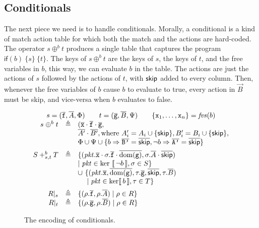 \subsection{Conditionals}

The next piece we need is to handle conditionals. Morally, a
conditional is a kind of match action table for which both the match
and the actions are hard-coded.  The operator $s \oplus^b t$ produces
a single table that captures the program
$\mathsf{if}(b)~\{s\}~\{t\}$. The keys of $s \oplus^b t$ are the keys
of $s$, the keys of $t$, and the free variables in $b$, this way, we
can evaluate $b$ in the table.  The actions are just the actions of
$s$ followed by the actions of $t$, with $\mathsf{skip}$ added to every
column. Then, whenever the free variables of $b$ cause $b$ to evaluate
to true, every action in $\vec B$ must be skip, and vice-versa when
$b$ evaluates to false.



\begin{figure}[tpb]
  \[\begin{array}{rcl}
      \multicolumn 3 c {s = (\vec{\var f}, \vec A, \Phi) \qquad t = (\vec{\var g}, \vec B, \Psi) \qquad \{\var x_1, \ldots, \var x_n\} = \fvs(b)}\\
      s \mathrel{\oplus^b} t
      & \triangleq
      & (\vec{\var x}\cdot\vec{\var f}\cdot \vec{\var g},\\
      && \vec{A'}\cdot\vec{B'}, \text{where}~ A'_i = A_i \cup \{\SKIP\}, B'_i = B_i \cup\{\SKIP\}, \\
      && \Phi \cup \Psi \cup \{b \Rightarrow \vec{\var{B'}} = \overrightarrow \SKIP, \neg b \Rightarrow \vec {\var{A'}} = \overrightarrow\SKIP\}\\[.5em]
      S +^b_{s,t} T
      & \triangleq
      & \{(\pkt.\vec{\var x}\cdot \sigma.\vec{\var{f}} \cdot \overline{\dom(\var{g})}, \sigma.\vec A \cdot \overline{\SKIP})\\
      &&\mid \pkt \in \ker~\bracbb{\neg b}, \sigma \in S \} \\
      && \cup~\{(\pkt.\vec{\var x}, \overline{\dom(\var{g})}, \tau.\vec{\var{g}}, \overline{\SKIP}, \tau.\vec B) \\
      && \phantom{\cup}~\mid \pkt \in \ker \bracbb{b}, \tau \in T \}\\[.5em]
      R|_s
      &\triangleq
      & \{(\rho.\vec{\var f},\rho.{\vec A}) \mid  \rho \in R\}\\
      R|_t
      & \triangleq
      & \{(\rho.\vec{\var g}, \rho.\vec B) \mid \rho \in R\}
    \end{array}
  \]
  \caption{The encoding of conditionals. }
  \label{fig:conditionals}
\end{figure}

